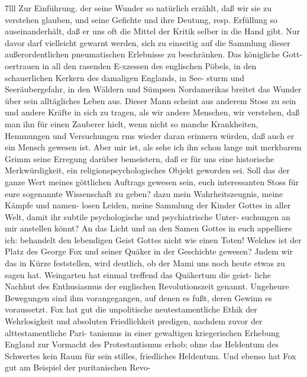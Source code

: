 7lll Zur Einführung.
der seine Wunder so natürlich erzählt, daß wir sie zu verstehen
glauben, und seine Gefichte und ihre Deutung, resp. Erfüllung
so auseinanderhält, daß er uns oft die Mittel der Kritik selber
in die Hand gibt. Nur davor darf vielleicht gewarnt werden,
sich zu einseitig auf die Sammlung dieser außerordentlichen
pneumatischen Erlebnisse zu beschränken. Das königliche Gott-
oertrauen in all den rasenden E-xzessen des englischen Pöbels,
in den schauerlichen Kerkern des damaligen Englands, in See-
sturm und Seeräubergefahr, in den Wäldern und Sümpsen
Nordamerikas breitet das Wunder über sein alltägliches Leben
aus. Dieser Mann scheint aus anderem Stoss zu sein und andere
Kräfte in sich zu tragen, als wir andere Menschen, wir verstehen,
daß man ihn für einen Zauberer hielt, wenn nicht so manche
Krankheiten, Hemmungen und Versuchungen rms wieder daran
erinnern würden, daß auch er ein Mensch gewesen ist.
Aber mir ist, als sehe ich ihn schon lange mit merkbarem Grimm
seine Erregung darüber bemeistern, daß er für uns eine historische
Merkwürdigkeit, ein religionspsychologisches Objekt geworden sei.
Soll das der ganze Wert meines göttlichen Auftrags gewesen
sein, euch interessanten Stoss für eure sogenannte Wissenschaft zu
geben? dazu mein Wahrheitszeugnis, meine Kämpfe und namen-
losen Leiden, meine Sammlung der Kinder Gottes in aller
Welt, damit ihr subtile psychologische und psychiatrische Unter-
suchungen an mir anstellen könnt? An das Licht und an den
Samen Gottes in euch appelliere ich: behandelt den lebendigen
Geist Gottes nicht wie einen Toten!
Welches ist der Platz des George Fox und seiner Quäker
in der Geschichte gewesen? Jndem wir das in Kürze feststellen,
wird deutlich, ob der Mami uns noch heute etwas zu sagen hat.
Weingarten hat einmal treffend das Quäkertum die geist-
liche Nachhut des Enthusiasmus der englischen Revolutionszeit
genannt. Ungeheure Bewegungen sind ihm vorangegangen, auf
denen es fußt, deren Gewinn es voraussetzt. Fox hat gut die
unpolitische neutestamentliche Ethik der Wehrlosigkeit und absoluten
Friedlichkeit predigen, nachdem zuvor der alttestamentliche Pari-
tanismus in einer gewaltigen kriegerischen Erhebung England
zur Vormacht des Protestantismus erhob; ohne das Heldentum
des Schwertes kein Raum für sein stilles, friedliches Heldentum.
Und ebenso hat Fox gut am Beispiel der puritanischen Revo-


